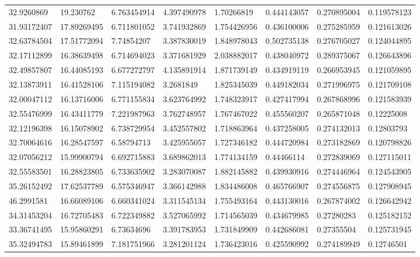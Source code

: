 \begin{landscape}
\begin{longtable}{llllllll}
    32.9260869  & 19.230762   & 6.763454914 & 4.397490978 & 1.70266819  & 0.444143057 & 0.270895004 & 0.119578123 \\
    31.93172407 & 17.89269495 & 6.711801052 & 3.741932869 & 1.754426956 & 0.436100006 & 0.275285959 & 0.121613026 \\
    32.63784504 & 17.51772094 & 7.74854207  & 3.387830019 & 1.848978043 & 0.502735138 & 0.276705027 & 0.124044895 \\
    32.17112899 & 16.38639498 & 6.714694023 & 3.371681929 & 2.038882017 & 0.438040972 & 0.289375067 & 0.126643896 \\
    32.49857807 & 16.44085193 & 6.677272797 & 4.135891914 & 1.871739149 & 0.434919119 & 0.266953945 & 0.121059895 \\
    32.13873911 & 16.41528106 & 7.115194082 & 3.2681849   & 1.825345039 & 0.449182034 & 0.271996975 & 0.121709108 \\
    32.00047112 & 16.13716006 & 6.771155834 & 3.623764992 & 1.748323917 & 0.427417994 & 0.267868996 & 0.121583939 \\
    32.55476999 & 16.43411779 & 7.221987963 & 3.762748957 & 1.767467022 & 0.455560207 & 0.265871048 & 0.12225008  \\
    32.12196398 & 16.15078902 & 6.738729954 & 3.452557802 & 1.718863964 & 0.437258005 & 0.274132013 & 0.12803793  \\
    32.70064616 & 16.28547597 & 6.58794713  & 3.425955057 & 1.727346182 & 0.444720984 & 0.273182869 & 0.120798826 \\
    32.07056212 & 15.99900794 & 6.692715883 & 3.689862013 & 1.774134159 & 0.44466114  & 0.272839069 & 0.127115011 \\
    32.55583501 & 16.28823805 & 6.733635902 & 3.283070087 & 1.882145882 & 0.439930916 & 0.274446964 & 0.124543905 \\
    35.26152492 & 17.62537789 & 6.575346947 & 3.366142988 & 1.834486008 & 0.465766907 & 0.274556875 & 0.127908945 \\
    46.2991581  & 16.66089106 & 6.660341024 & 3.311545134 & 1.755493164 & 0.443130016 & 0.267874002 & 0.126642942 \\
    34.31453204 & 16.72705483 & 6.722349882 & 3.527065992 & 1.714565039 & 0.434679985 & 0.27280283  & 0.125182152 \\
    33.36741495 & 15.95860291 & 6.73634696  & 3.391783953 & 1.731849909 & 0.442686081 & 0.27355504  & 0.125731945 \\
    35.32494783 & 15.89461899 & 7.181751966 & 3.281201124 & 1.736423016 & 0.425590992 & 0.274189949 & 0.12746501  \\

\end{longtable}
\end{landscape}
